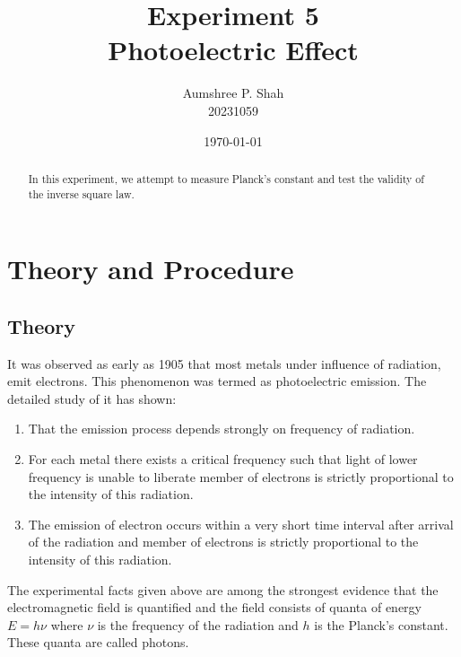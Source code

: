 \documentclass[%
 sor,
 jor,
 amsmath,amssymb,
 reprint,%
]{revtex4-2}
\begin{document}

\title{Experiment 5\\Photoelectric Effect}

\author{Aumshree P. Shah\\20231059\color{red}}
\altaffiliation[\color{red}]{aumshree.pinkalbenshah@students.iiserpune.ac.in}
\date{\today}
\vspace{1cm}
\begin{abstract}
\centering
In this experiment, we attempt to measure Planck's constant and test the validity of the inverse square law.
\end{abstract}
\maketitle
\section{Theory and Procedure}
\subsection{Theory}
It was observed as early as 1905 that most metals under influence of radiation, emit electrons. This phenomenon was termed as photoelectric emission. The detailed study of it has shown:
\begin{enumerate}
  \item That the emission process depends strongly on frequency of radiation.
  \item For each metal there exists a critical frequency such that light of lower frequency is unable to liberate member of electrons is strictly proportional to the intensity of this radiation.
  \item The emission of electron occurs within a very short time interval after arrival of the radiation and member of electrons is strictly proportional to the intensity of this radiation. 
\end{enumerate}
The experimental facts given above are among the strongest evidence that the electromagnetic field is quantified and the field consists of quanta of energy $E = h \nu$ where $\nu$ is the frequency of the radiation and $h$ is the Planck’s constant. These quanta are called photons. \\
\end{document}
